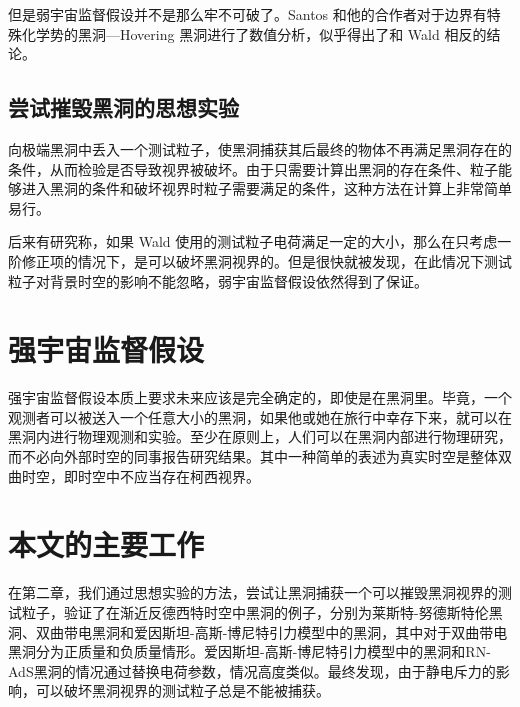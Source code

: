 但是弱宇宙监督假设并不是那么牢不可破了。Santos 和他的合作者对于边界有特殊化学势的黑洞—Hovering 黑洞进行了数值分析\citep{horowitz2015hovering,crisford2017violating}，似乎得出了和 Wald 相反的结论。
\subsection{尝试摧毁黑洞的思想实验}
向极端黑洞中丢入一个测试粒子，使黑洞捕获其后最终的物体不再满足黑洞存在的条件，从而检验是否导致视界被破坏。由于只需要计算出黑洞的存在条件、粒子能够进入黑洞的条件和破坏视界时粒子需要满足的条件，这种方法在计算上非常简单易行。

后来有研究称，如果 Wald 使用的测试粒子电荷满足一定的大小，那么在只考虑一阶修正项的情况下，是可以破坏黑洞视界的\citep{hubeny1999overcharging}。但是很快就被发现，在此情况下测试粒子对背景时空的影响不能忽略\citep{hod2002cosmic,barausse2010test,colleoni2015overspinning,wald2018kerr,sorce2017gedanken}，弱宇宙监督假设依然得到了保证。

\section{强宇宙监督假设}
强宇宙监督假设本质上要求未来应该是完全确定的，即使是在黑洞里。毕竟，一个观测者可以被送入一个任意大小的黑洞，如果他或她在旅行中幸存下来，就可以在黑洞内进行物理观测和实验。至少在原则上，人们可以在黑洞内部进行物理研究，而不必向外部时空的同事报告研究结果\citep{ong2020space}。其中一种简单的表述为真实时空是整体双曲时空，即时空中不应当存在柯西视界。

\section{本文的主要工作}

在第二章，我们通过思想实验的方法，尝试让黑洞捕获一个可以摧毁黑洞视界的测试粒子，验证了在渐近反德西特时空中黑洞的例子，分别为莱斯特-努德斯特伦黑洞、双曲带电黑洞和爱因斯坦-高斯-博尼特引力模型中的黑洞，其中对于双曲带电黑洞分为正质量和负质量情形。爱因斯坦-高斯-博尼特引力模型中的黑洞和RN-AdS黑洞的情况通过替换电荷参数，情况高度类似。最终发现，由于静电斥力的影响，可以破坏黑洞视界的测试粒子总是不能被捕获。